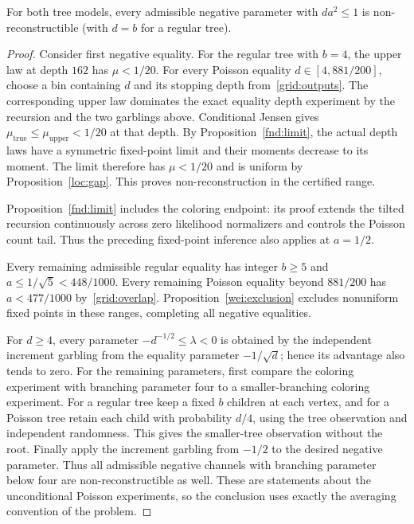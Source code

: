 \begin{proposition}
\label{grid:negative-completion}
For both tree models, every admissible negative parameter with
$da^2\leq1$ is non-reconstructible (with $d=b$ for a regular tree).
\end{proposition}
\begin{proof}
Consider first negative equality.  For the regular tree with $b=4$,
the upper law at depth $162$ has $\mu<1/20$.  For every Poisson
equality $d\in[4,881/200]$, choose a bin containing $d$ and its stopping
depth from~\eqref{grid:outputs}.  The corresponding upper law dominates
the exact equality depth experiment by the recursion and the two
garblings above.  Conditional Jensen gives
\mbox{$\mu_{\mathrm{true}}\leq\mu_{\mathrm{upper}}<1/20$} at that depth.
By Proposition~\ref{fnd:limit}, the actual depth laws have a symmetric
fixed-point limit and their moments decrease to its moment.  The limit
therefore has $\mu<1/20$ and is uniform by Proposition~\ref{loc:gap}.
This proves non-reconstruction in the certified range.

Proposition~\ref{fnd:limit} includes the coloring endpoint: its proof
extends the tilted recursion continuously across zero likelihood
normalizers and controls the Poisson count tail. Thus the preceding
fixed-point inference also applies at $a=1/2$.

Every remaining admissible regular equality has integer $b\geq5$ and
$a\leq1/\sqrt5<448/1000$.  Every remaining Poisson equality beyond
$881/200$ has $a<477/1000$ by~\eqref{grid:overlap}.
Proposition~\ref{wei:exclusion} excludes nonuniform fixed points in
these ranges, completing all negative equalities.

For $d\geq4$, every parameter $-d^{-1/2}\le\lambda<0$ is obtained by
the independent increment garbling from the equality parameter
$-1/\sqrt d$; hence its advantage also tends to zero.  For the remaining
parameters, first compare the coloring experiment with branching
parameter four to a smaller-branching coloring experiment.  For a
regular tree keep a fixed $b$ children at each vertex, and for a Poisson
tree retain each child with probability $d/4$, using the tree observation
and independent randomness.  This gives the smaller-tree observation
without the root.  Finally apply the increment garbling from $-1/2$ to
the desired negative parameter.  Thus all admissible negative channels
with branching parameter below four are non-reconstructible as well.
These are statements about the unconditional Poisson experiments, so
the conclusion uses exactly the averaging convention of the problem.
\end{proof}
